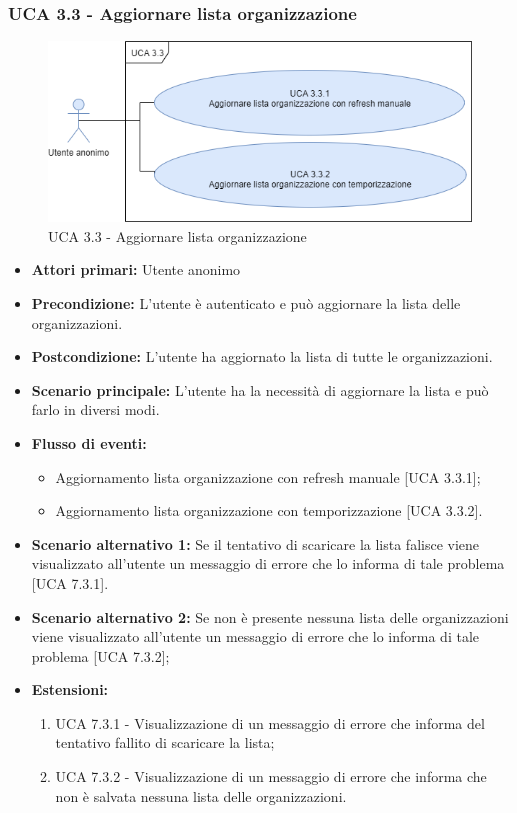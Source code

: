\subsubsection{UCA 3.3 - Aggiornare lista organizzazione}%

\begin{figure}[h]
	\centering
	\includegraphics[scale=0.5]{sezioni/UseCase/Immagini/UCA3.3.png}
	\caption{UCA 3.3 - Aggiornare lista organizzazione}
\end{figure}

\begin{itemize} 
	\item \textbf{Attori primari:} Utente anonimo
	\item \textbf{Precondizione:} L'utente è autenticato e può aggiornare la lista delle organizzazioni.
	\item \textbf{Postcondizione:} L'utente ha aggiornato la lista di tutte le organizzazioni.
	\item \textbf{Scenario principale:}  L'utente ha la necessità di aggiornare la lista e può farlo in diversi modi.
	\item \textbf{Flusso di eventi:}
	\begin{itemize}
		\item Aggiornamento lista organizzazione con refresh manuale [UCA 3.3.1];
		\item Aggiornamento lista organizzazione con temporizzazione [UCA 3.3.2].
	\end{itemize}
	\item \textbf{Scenario alternativo 1:} Se il tentativo di scaricare la lista falisce viene visualizzato all'utente un messaggio di errore che lo informa di tale problema [UCA 7.3.1].
	\item \textbf{Scenario alternativo 2:} Se non è presente nessuna lista delle organizzazioni viene visualizzato all'utente un messaggio di errore che lo informa di tale problema [UCA 7.3.2];
	\item \textbf{Estensioni:}
	\begin{enumerate}
		\item UCA 7.3.1 - Visualizzazione di un messaggio di errore che informa del tentativo fallito di scaricare la lista;
		\item UCA 7.3.2 - Visualizzazione di un messaggio di errore che informa che non è salvata nessuna lista delle organizzazioni.
	\end{enumerate}
\end{itemize}

